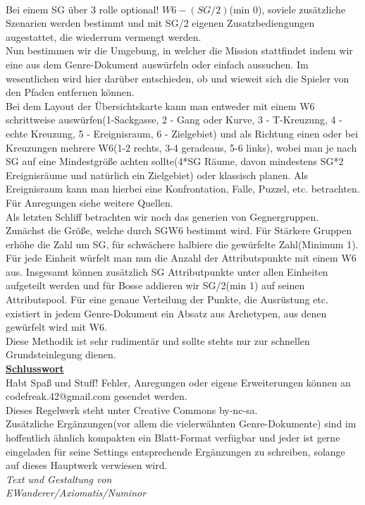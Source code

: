 \documentclass[twoside,a4paper]{minimal}
\begin{document}
\begin{multicols*}{3}
\\Bei einem SG über 3 rolle optional! $W6-(SG/2)$(min 0), soviele zusätzliche Szenarien werden bestimmt und mit SG/2 eigenen Zusatzbediengungen augestattet, die wiederrum vermengt werden.
\\Nun bestimmen wir die Umgebung, in welcher die Mission stattfindet indem wir eine aus dem Genre-Dokument auswürfeln oder einfach aussuchen. Im wesentlichen wird hier darüber entschieden, ob und wieweit sich die Spieler von den Pfaden entfernen können.
\\Bei dem Layout der Übersichtskarte kann man entweder mit einem W6 schrittweise auswürfen(1-Sackgasse, 2 - Gang oder Kurve, 3 - T-Kreuzung, 4 - echte Kreuzung, 5 - Ereignisraum, 6 - Zielgebiet) und als Richtung einen oder bei Kreuzungen mehrere W6(1-2 rechts, 3-4 geradeaus, 5-6 links), wobei man je nach SG auf eine Mindestgröße achten sollte(4*SG Räume, davon mindestens SG*2 Ereignisräume und natürlich ein Zielgebiet) oder klassisch planen. Als Ereignisraum kann man hierbei eine Konfrontation, Falle, Puzzel, etc. betrachten. Für Anregungen siehe weitere Quellen.
\\Als letzten Schliff betrachten wir noch das generien von Gegnergruppen. Zunächst die Größe, welche durch SGW6 bestimmt wird. Für Stärkere Gruppen erhöhe die Zahl um SG, für schwächere halbiere die gewürfelte Zahl(Minimum 1). Für jede Einheit würfelt man nun die Anzahl der Attributspunkte mit einem W6 aus. Insgesamt können zusätzlich SG Attributpunkte unter allen Einheiten aufgeteilt werden und für Bosse addieren wir SG/2(min 1) auf seinen Attributspool. Für eine genaue Verteilung der Punkte, die Ausrüstung etc. existiert in jedem Genre-Dokument ein Absatz aus Archetypen, aus denen gewürfelt wird mit W6.
\\Diese Methodik ist sehr rudimentär und sollte stehts nur zur schnellen Grundsteinlegung dienen.
\textbf{\uline{\\Schlusswort}}
\\Habt Spaß und Stuff! Fehler, Anregungen oder eigene Erweiterungen können an codefreak.42@gmail.com gesendet werden. 
\\Dieses Regelwerk steht unter Creative Commons by-nc-sa.
\\Zusätzliche Ergänzungen(vor allem die vielerwähnten Genre-Dokumente) sind im hoffentlich ähnlich kompakten ein Blatt-Format verfügbar und jeder ist gerne eingeladen für seine Settings entsprechende Ergänzungen zu schreiben, solange auf dieses Hauptwerk verwiesen wird. 
\textit{\\Text und Gestaltung von\\EWanderer/Axiomatis/Numinor}
\end{multicols*}
\end{document}

